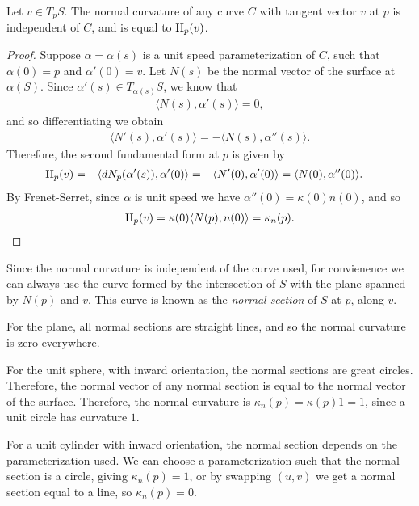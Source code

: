 \begin{prop}
    Let $v \in T_pS$. The normal curvature of any curve $C$ with tangent vector $v$ at $p$ is independent of $C$, and is equal to $\operatorname{II}_p(v)$.
\end{prop}

\begin{proof}
    Suppose $\alpha = \alpha(s)$ is a unit speed parameterization of $C$, such that $\alpha(0) = p$ and $\alpha'(0) = v$. Let $N(s)$ be the normal vector of the surface at $\alpha(S)$. Since $\alpha'(s) \in T_{\alpha(s)}S$, we know that
    \begin{align*}
        \langle N(s), \alpha'(s)\rangle = 0,
    \end{align*}
    and so differentiating we obtain
    \begin{align*}
        \langle N'(s), \alpha'(s)\rangle = -\langle N(s), \alpha''(s)\rangle.
    \end{align*}
    Therefore, the second fundamental form at $p$ is given by
    \begin{align*}
        \operatorname{II}_{p}(v) &= -\langle dN_p(\alpha'(s)), \alpha'(0)\rangle = -\langle N'(0), \alpha'(0)\rangle = \langle N(0), \alpha''(0)\rangle.
    \end{align*}
    By Frenet-Serret, since $\alpha$ is unit speed we have $\alpha''(0) = \kappa(0)n(0)$, and so
    \begin{align*}
        \operatorname{II}_p(v) = \kappa(0)\langle N(p), n(0)\rangle = \kappa_n(p).
    \end{align*}
\end{proof}

\begin{rmk}
    Since the normal curvature is independent of the curve used, for convienence we can always use the curve formed by the intersection of $S$ with the plane spanned by $N(p)$ and $v$. This curve is known as the \emph{normal section} of $S$ at $p$, along $v$.
\end{rmk}

\begin{exmp}
    For the plane, all normal sections are straight lines, and so the normal curvature is zero everywhere.

    For the unit sphere, with inward orientation, the normal sections are great circles. Therefore, the normal vector of any normal section is equal to the normal vector of the surface. Therefore, the normal curvature is $\kappa_n(p) = \kappa(p)1 = 1$, since a unit circle has curvature $1$.

    For a unit cylinder with inward orientation, the normal section depends on the parameterization used. We can choose a parameterization such that the normal section is a circle, giving $\kappa_n(p) = 1$, or by swapping $(u, v)$ we get a normal section equal to a line, so $\kappa_n(p) = 0$.
\end{exmp}

